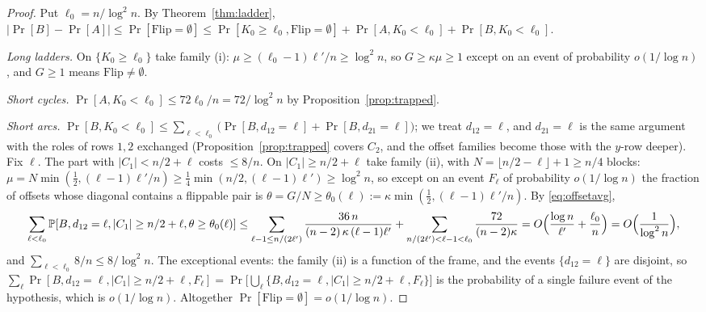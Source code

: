\begin{proof}
Put $\ell_0=n/\log^2n$.  By Theorem~\ref{thm:ladder},
$|\Pr[B]-\Pr[A]|\le\Pr[\mathrm{Flip}=\emptyset]\le
\Pr[K_0\ge\ell_0,\mathrm{Flip}=\emptyset]+\Pr[A,K_0<\ell_0]+\Pr[B,K_0<\ell_0]$.

\emph{Long ladders.}  On $\{K_0\ge\ell_0\}$ take family (i):
$\mu\ge(\ell_0-1)\ell'/n\ge\log^2n$, so $G\ge\kappa\mu\ge1$ except on an
event of probability $o(1/\log n)$, and $G\ge1$ means
$\mathrm{Flip}\ne\emptyset$.

\emph{Short cycles.}  $\Pr[A,K_0<\ell_0]\le72\ell_0/n=72/\log^2n$ by
Proposition~\ref{prop:trapped}.

\emph{Short arcs.}  $\Pr[B,K_0<\ell_0]\le\sum_{\ell<\ell_0}\bigl(\Pr[B,d_{12}=\ell]+\Pr[B,d_{21}=\ell]\bigr)$;
we treat $d_{12}=\ell$, and $d_{21}=\ell$ is the same argument with the
roles of rows $1,2$ exchanged (Proposition~\ref{prop:trapped} covers
$C_2$, and the offset families become those with the $y$-row deeper).
Fix $\ell$.  The part with $|C_1|<n/2+\ell$ costs $\le8/n$.  On
$|C_1|\ge n/2+\ell$ take family (ii), with $N=\lfloor n/2-\ell\rfloor+1\ge n/4$
blocks: $\mu=N\min(\tfrac12,(\ell-1)\ell'/n)\ge\tfrac14\min(n/2,(\ell-1)\ell')\ge\log^2n$,
so except on an event $F_\ell$ of probability $o(1/\log n)$ the
fraction of offsets whose diagonal contains a flippable pair is
$\theta=G/N\ge\theta_0(\ell):=\kappa\min(\tfrac12,(\ell-1)\ell'/n)$.  By
\eqref{eq:offsetavg},
\[
\sum_{\ell<\ell_0}\Pr[B,d_{12}=\ell,|C_1|\ge n/2+\ell,\theta\ge\theta_0(\ell)]
\le\sum_{\ell-1\le n/(2\ell')}\frac{36\,n}{(n-2)\,\kappa\,(\ell-1)\ell'}
+\sum_{n/(2\ell')<\ell-1<\ell_0}\frac{72}{(n-2)\kappa}
=O\Bigl(\frac{\log n}{\ell'}+\frac{\ell_0}{n}\Bigr)=O\Bigl(\frac1{\log^2n}\Bigr),
\]
and $\sum_{\ell<\ell_0}8/n\le8/\log^2n$.  The exceptional events: the
family (ii) is a function of the frame, and the events $\{d_{12}=\ell\}$
are disjoint, so $\sum_\ell\Pr[B,d_{12}=\ell,|C_1|\ge n/2+\ell,F_\ell]
=\Pr\bigl[\bigcup_\ell\{B,d_{12}=\ell,|C_1|\ge n/2+\ell,F_\ell\}\bigr]$ is
the probability of a single failure event of the hypothesis, which is
$o(1/\log n)$.
Altogether $\Pr[\mathrm{Flip}=\emptyset]=o(1/\log n)$.
\end{proof}

